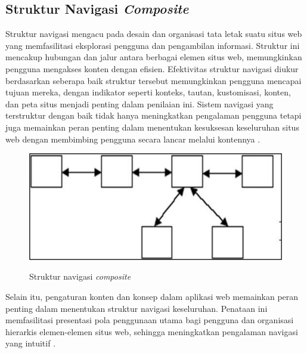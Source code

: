 \subsection{Struktur Navigasi \textit{Composite}}
Struktur navigasi mengacu pada desain dan organisasi tata letak suatu situs web yang memfasilitasi eksplorasi pengguna dan pengambilan informasi. Struktur ini mencakup hubungan dan jalur antara berbagai elemen situs web, memungkinkan pengguna mengakses konten dengan efisien. Efektivitas struktur navigasi diukur berdasarkan seberapa baik struktur tersebut memungkinkan pengguna mencapai tujuan mereka, dengan indikator seperti konteks, tautan, kustomisasi, konten, dan peta situs menjadi penting dalam penilaian ini. Sistem navigasi yang terstruktur dengan baik tidak hanya meningkatkan pengalaman pengguna tetapi juga memainkan peran penting dalam menentukan kesuksesan keseluruhan situs web dengan membimbing pengguna secara lancar melalui kontennya \citep{dewiyana2018website}.

\begin{figure}[htbp]
  \centering
  \includegraphics[width=0.85\linewidth]{images/bab-2/composite-sitemap.png}
  \caption{Struktur navigasi \emph{composite}}\label{fig:composite-sitemap}\citep{perrina2021rancang}
\end{figure}

Selain itu, pengaturan konten dan konsep dalam aplikasi web memainkan peran penting dalam menentukan struktur navigasi keseluruhan. Penataan ini memfasilitasi presentasi pola penggunaan utama bagi pengguna dan organisasi hierarkis elemen-elemen situs web, sehingga meningkatkan pengalaman navigasi yang intuitif \citep{ceci2020closed}.

